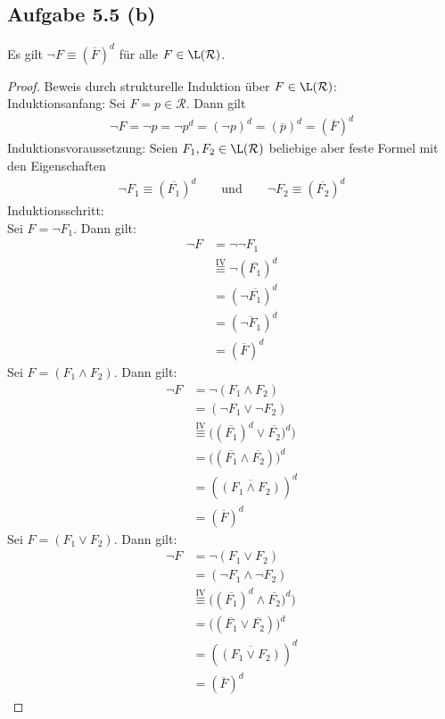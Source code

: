 \documentclass[12pt,a4paper]{article}
\newcommand{\RR}{\mathcal{R}}
\begin{document}
\subsection*{Aufgabe 5.5 (b)}
Es gilt $\neg F\equiv(\overline{F})^d$ für alle $F\in\L(\RR)$.
\begin{proof}
Beweis durch strukturelle Induktion über $F\in\L(\RR)$:\\
Induktionsanfang: Sei $F=p\in\RR$. Dann gilt
\begin{align*}
\neg F=\neg p=\neg p^d=(\neg p)^d=(\overline{p})^d=(\overline{F})^d
\end{align*}
Induktionsvoraussetzung: Seien $F_1,F_2\in\L(\RR)$ beliebige aber feste Formel mit den Eigenschaften
\begin{align*}
\neg F_1\equiv (\overline{F_1})^d
\qquad\text{und}\qquad
\neg F_2\equiv (\overline{F_2})^d
\end{align*}
Induktionsschritt:\\
Sei $F=\neg F_1$. Dann gilt:
\begin{align*}
\neg F
&=\neg\neg F_1\\
&\stackrel{\text{IV}}{\equiv}
\neg(\overline{F_1})^d\\
&=(\neg\overline{F_1})^d\\
&=(\overline{\neg F_1})^d\\
&=(\overline{F})^d
\end{align*}
Sei $F=(F_1\wedge F_2)$. Dann gilt:
\begin{align*}
\neg F
&=\neg(F_1\wedge F_2)\\
&=(\neg F_1\vee\neg F_2)\\
&\stackrel{\text{IV}}{\equiv}
\big((\overline{F_1})^d\vee\overline{F_2})^d\big)\\
&=\big((\overline{F_1}\wedge\overline{F_2})\big)^d\\
&=(\overline{(F_1\wedge F_2)})^d\\
&=(\overline{F})^d
\end{align*}
Sei $F=(F_1\vee F_2)$. Dann gilt:
\begin{align*}
\neg F
&=\neg(F_1\vee F_2)\\
&=(\neg F_1\wedge\neg F_2)\\
&\stackrel{\text{IV}}{\equiv}
\big((\overline{F_1})^d\wedge\overline{F_2})^d\big)\\
&=\big((\overline{F_1}\vee\overline{F_2})\big)^d\\
&=(\overline{(F_1\vee F_2)})^d\\
&=(\overline{F})^d
\end{align*}
\end{proof}
\end{document}
